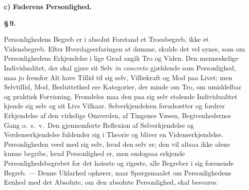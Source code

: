 \documentclass[12pt]{book}
\newcommand{\parmark}[1]{\begin{center}{\bfseries \S\,#1.}\end{center}}
\newcommand{\runhead}[1]{%
  \medskip\begin{center}{\bfseries #1}\end{center}\medskip}
\begin{document}
\runhead{c) Faderens Personlighed.}
\parmark{9}

Personlighedens Begreb er i absolut Forstand et Troesbegreb, ikke et
Vidensbegreb. Efter Hverdagserfaringen at dømme, skulde det vel
synes, som om Personlighedens Erkjendelse i lige Grad angik Tro og
Viden. Den menneskelige Individualitet, der skal gjøre sit Selv
\textit{in concreto} gjældende som Personlighed, maa jo fremfor Alt
have Tillid til sig selv, Villiekraft og Mod paa Livet; men
Selvtillid, Mod, Besluttethed ere Kategorier, der minde om Tro, om
umiddelbar og praktisk Forvisning. Fremdeles maa den paa sig selv
stolende Individualitet kjende sig selv og sit Livs Vilkaar.
Selverkjendelsen forudsætter og fordrer Erkjendelse af den virkelige
Omverden, af Tingenes Væsen, Begivenhedernes Gang o.\ s.\ v.\ Den
gjennemførte Reflexion af Selverkjendelse og Verdenserkjendelse
fuldender sig i Theorie og bliver en Videnserkjendelse.
Personligheden veed med sig selv, hvad den selv er; den vil altsaa
ikke alene kunne begribe, hvad Personlighed er, men endogsaa
erkjende Personlighedsbegrebet for det høieste og rigeste, alle
Begreber i sig forenende Begreb. --- Denne Uklarhed ophører, naar
Spørgsmaalet om Personlighedens Eenhed med det Absolute, om den
absolute Personlighed, skal besvares.
\end{document}
